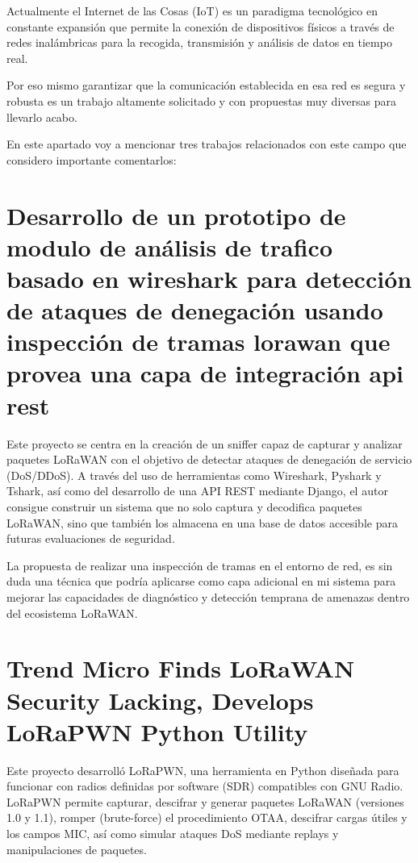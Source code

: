 
Actualmente el Internet de las Cosas (IoT) es un paradigma tecnológico en constante expansión que permite la conexión de dispositivos físicos a través de redes inalámbricas para la recogida, transmisión y análisis de datos en tiempo real.

Por eso mismo garantizar que la comunicación establecida en esa red es segura y robusta es un trabajo altamente solicitado y con propuestas muy diversas para llevarlo acabo.

En este apartado voy a mencionar tres trabajos relacionados con este campo que considero importante comentarlos:


\section{Desarrollo de un prototipo de modulo de análisis de
trafico basado en wireshark para detección de ataques de denegación usando inspección de tramas lorawan que provea una capa de integración api rest}

Este proyecto \cite{Rel1} se centra en la creación de un sniffer capaz de capturar y analizar paquetes LoRaWAN con el objetivo de detectar ataques de denegación de servicio (DoS/DDoS). A través del uso de herramientas como Wireshark, Pyshark y Tshark, así como del desarrollo de una API REST mediante Django, el autor consigue construir un sistema que no solo captura y decodifica paquetes LoRaWAN, sino que también los almacena en una base de datos accesible para futuras evaluaciones de seguridad.

 La propuesta de realizar una inspección de tramas en el entorno de red, es sin duda una técnica que podría aplicarse como capa adicional en mi sistema para mejorar las capacidades de diagnóstico y detección temprana de amenazas dentro del ecosistema LoRaWAN.
 


\section{Trend Micro Finds LoRaWAN Security Lacking, Develops LoRaPWN Python Utility}

Este proyecto \cite{Rel2} desarrolló LoRaPWN, una herramienta en Python diseñada para funcionar con radios definidas por software (SDR) compatibles con GNU Radio. LoRaPWN permite capturar, descifrar y generar paquetes LoRaWAN (versiones 1.0 y 1.1), romper (brute-force) el procedimiento OTAA, descifrar cargas útiles y los campos MIC, así como simular ataques DoS mediante replays y manipulaciones de paquetes.


